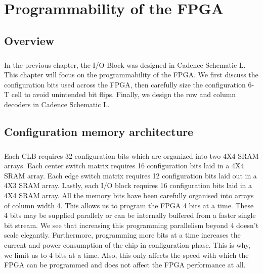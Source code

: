 %
%
\let\textcircled=\pgftextcircled
\chapter{Programmability of the FPGA}
\label{chap:programmability_design}
\paragraph{}

\section{Overview}

\paragraph{}
In the previous chapter, the I/O Block was designed in Cadence Schematic L. This chapter will focus on the programmability of the FPGA. We first discuss the configuration bits used across the FPGA, then carefully size the configuration 6-T cell to avoid unintended bit flips. Finally, we design the row and column decoders in Cadence Schematic L. 

\section{Configuration memory architecture}
\paragraph{}

Each CLB requires 32 configuration bits which are organized into two 4X4 SRAM arrays. Each center switch matrix requires 16 configuration bits laid in a 4X4 SRAM array. Each edge switch matrix requires 12 configuration bits laid out in a 4X3 SRAM array. Lastly, each I/O block requires 16 configuration bits laid in a 4X4 SRAM array. All the memory bits have been carefully organised into arrays of column width 4. This allows us to program the FPGA 4 bits at a time. These 4 bits may be supplied parallely or can be internally buffered from a faster single bit stream. We see that increasing this programming parallelism beyond 4 doesn't scale elegantly. Furthermore, programming more bits at a time increases the current and power consumption of the chip in configuration phase. This is why, we limit us to 4 bits at a time. Also, this only affects the speed with which the FPGA can be programmed and does not affect the FPGA performance at all.

